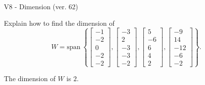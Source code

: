 \begin{exercise}
  \begin{exerciseTitle}V8 - Dimension (ver. 62)\end{exerciseTitle}
  \begin{exerciseStatement}
    Explain how to find the dimension of 
\[W=\mathrm{span}\ \left\{\left[\begin{array}{r}
-1 \\
-2 \\
0 \\
-2 \\
-2
\end{array}\right] , \left[\begin{array}{r}
-3 \\
2 \\
-3 \\
-3 \\
-2
\end{array}\right] , \left[\begin{array}{r}
5 \\
-6 \\
6 \\
4 \\
2
\end{array}\right] , \left[\begin{array}{r}
-9 \\
14 \\
-12 \\
-6 \\
-2
\end{array}\right]\right\}.\]



  \end{exerciseStatement}
  \begin{exerciseAnswer}
   The dimension of \(W\) is  \(2\).
  


  \end{exerciseAnswer}
\end{exercise}